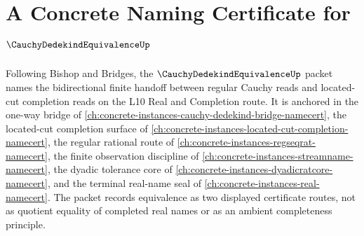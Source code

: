 \chapter{A Concrete Naming Certificate for $\CauchyDedekindEquivalenceUp$}
\label{ch:concrete-instances-cauchy-dedekind-equivalence-namecert}

Following Bishop and Bridges, the $\CauchyDedekindEquivalenceUp$ packet names the bidirectional finite handoff between regular Cauchy reads and located-cut completion reads on the L10 Real and Completion route. It is anchored in the one-way bridge of \autoref{ch:concrete-instances-cauchy-dedekind-bridge-namecert}, the located-cut completion surface of \autoref{ch:concrete-instances-located-cut-completion-namecert}, the regular rational route of \autoref{ch:concrete-instances-regseqrat-namecert}, the finite observation discipline of \autoref{ch:concrete-instances-streamname-namecert}, the dyadic tolerance core of \autoref{ch:concrete-instances-dyadicratcore-namecert}, and the terminal real-name seal of \autoref{ch:concrete-instances-real-namecert}. The packet records equivalence as two displayed certificate routes, not as quotient equality of completed real names or as an ambient completeness principle.

